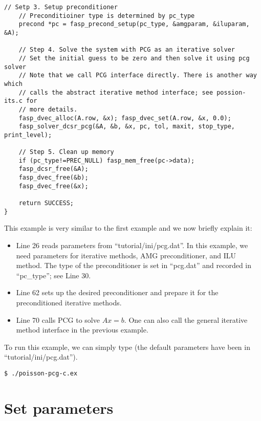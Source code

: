 \documentclass[11pt]{memoir}
\begin{document}
\begin{lstlisting}[stepnumber=1,firstnumber=1]
    // Setp 3. Setup preconditioner
    // Preconditioiner type is determined by pc_type
    precond *pc = fasp_precond_setup(pc_type, &amgparam, &iluparam, &A);

    // Step 4. Solve the system with PCG as an iterative solver
    // Set the initial guess to be zero and then solve it using pcg solver
    // Note that we call PCG interface directly. There is another way which
    // calls the abstract iterative method interface; see possion-its.c for
    // more details. 
    fasp_dvec_alloc(A.row, &x); fasp_dvec_set(A.row, &x, 0.0);
    fasp_solver_dcsr_pcg(&A, &b, &x, pc, tol, maxit, stop_type, print_level);
    
    // Step 5. Clean up memory
    if (pc_type!=PREC_NULL) fasp_mem_free(pc->data);
    fasp_dcsr_free(&A);
    fasp_dvec_free(&b);
    fasp_dvec_free(&x);
    
    return SUCCESS;
}
\end{lstlisting}
%
This example is very similar to the first example and we now briefly explain it:
\begin{itemize}
%
\item Line 26 reads parameters from ``tutorial/ini/pcg.dat''. In this example, we need parameters for iterative methods, AMG preconditioner, and ILU method. The type of the preconditioner is set in ``pcg.dat'' and recorded in ``pc\_type''; see Line 30.
%
\item Line 62 sets up the desired preconditioner and prepare it for the preconditioned iterative methods. 
%
\item Line 70 calls PCG to solve $Ax=b$. One can also call the general iterative method interface in the previous example.
%
\end{itemize}
%
To run this example, we can simply type (the default parameters have been in ``tutorial/ini/pcg.dat'').
%
\begin{lstlisting}[numbers=none]
$ ./poisson-pcg-c.ex
\end{lstlisting}


\section{Set parameters}\label{sec:parameters}
\end{document}
